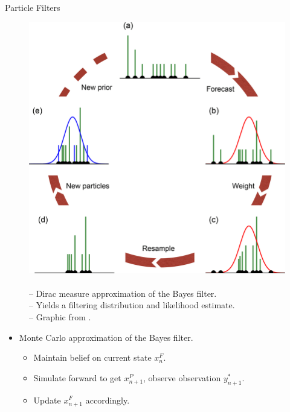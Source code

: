 \documentclass{beamer}
\begin{document}
\begin{frame}{Particle Filters}

    \begin{figure}
        \centering
        \begin{minipage}[c]{0.5\textwidth}
            \centering
            \includegraphics[scale=0.15]{imgs/pfilter.png}
            \end{minipage}
        \begin{minipage}[c]{0.45\textwidth}
            \caption{
            \\
            -- Dirac measure approximation of the Bayes filter. 
            \\ 
            -- Yields a filtering distribution and likelihood estimate.
            \\ 
            -- Graphic from \cite{berg19}.}
        \end{minipage}
        \label{fig:pfilter-illustration}
    \end{figure}
    
    \begin{itemize}
        \item Monte Carlo approximation of the Bayes filter.
        \begin{itemize}
            \item \pause Maintain belief on current state $x_n^F$. 
            \item \pause Simulate forward to get $x_{n+1}^P$, observe observation $y_{n+1}^*$.
            \item \pause Update $x_{n+1}^F$ accordingly.
        \end{itemize}
    \end{itemize}
\end{frame}
\end{document}
